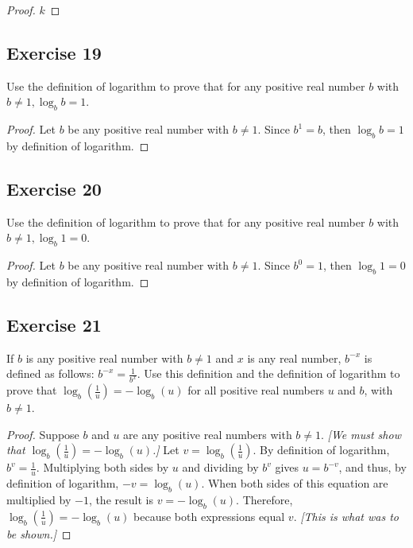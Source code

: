 \documentclass[14pt]{extarticle}
\newcommand{\dps}{\displaystyle}
\begin{document}
\begin{proof}
    $k$
\end{proof}

\subsection{Exercise 19}
Use the definition of logarithm to prove that for any positive real number $b$ with \(b \neq 1, \log_b b = 1\).

\begin{proof}
    Let $b$ be any positive real number with \(b \neq 1\). Since \(b^1 = b\), then \(\log_b b = 1\) by definition of logarithm.
\end{proof}

\subsection{Exercise 20}
Use the definition of logarithm to prove that for any positive real number $b$ with \(b \neq 1, \log_b 1 = 0\).

\begin{proof}
    Let $b$ be any positive real number with \(b \neq 1\). Since \(b^0 = 1\), then \(\log_b 1 = 0\) by definition of logarithm.
\end{proof}

\subsection{Exercise 21}
If $b$ is any positive real number with \(b \neq 1\) and $x$ is any real number, \(b^{-x}\) is defined as follows:
\(\dps b^{-x} = \frac{1}{b^x}\). Use this definition and the definition of logarithm to prove that \(\dps \log_b
\left(\frac{1}{u}\right) = -\log_b(u)\) for all positive real numbers $u$ and $b$, with \(b \neq 1\).

\begin{proof}
    Suppose $b$ and $u$ are any positive real numbers with \(b \neq 1\). {\it [We must show that \(\log_b (\frac{1}{u}) =
                -\log_b(u)\).]} Let \(v = \log_b (\frac{1}{u})\). By definition of logarithm, \(b^v = \frac{1}{u}\). Multiplying
    both sides by $u$ and dividing by $b^v$ gives \(u=b^{-v}\), and thus, by definition of logarithm, \(-v = \log_b(u)\).
    When both sides of this equation are multiplied by $-1$, the result is \(v = -\log_b(u)\). Therefore, \(\log_b
    (\frac{1}{u}) = - \log_b(u)\) because both expressions equal $v$. {\it [This is what was to be shown.]}
\end{proof}
\end{document}
